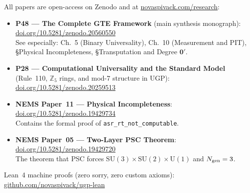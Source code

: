 \documentclass[11pt,a4paper]{article}
\newcommand{\lean}[1]{\texttt{#1}}
\begin{document}
\begin{tcolorbox}[colback=orange!8,colframe=orange!50!black,
  title=\textbf{Primary Sources}]
All papers are open-access on Zenodo and at
\href{https://novaspivack.com/research}{novaspivack.com/research}:
\begin{itemize}
\item \textbf{P48 --- The Complete GTE Framework} (main synthesis monograph):\\
  \href{https://doi.org/10.5281/zenodo.20560550}{doi.org/10.5281/zenodo.20560550}\\
  See especially: Ch.~5 (Binary Universality), Ch.~10 (Measurement and PIT),
  §Physical Incompleteness, §Transputation and Degree $\mathbf{0}'$.

\item \textbf{P28 --- Computational Universality and the Standard Model}\\
  (Rule~110, $\mathbb{Z}_5$ rings, and mod-7 structure in UGP):\\
  \href{https://doi.org/10.5281/zenodo.20259513}{doi.org/10.5281/zenodo.20259513}

\item \textbf{NEMS Paper~11 --- Physical Incompleteness}:\\
  \href{https://doi.org/10.5281/zenodo.19429734}{doi.org/10.5281/zenodo.19429734}\\
  Contains the formal proof of \lean{asr\_rt\_not\_computable}.

\item \textbf{NEMS Paper~05 --- Two-Layer PSC Theorem}:\\
  \href{https://doi.org/10.5281/zenodo.19429720}{doi.org/10.5281/zenodo.19429720}\\
  The theorem that PSC forces $\mathrm{SU}(3)\times\mathrm{SU}(2)\times\mathrm{U}(1)$
  and $N_{\rm gen}=3$.
\end{itemize}
Lean~4 machine proofs (zero sorry, zero custom axioms):\\
\href{https://github.com/novaspivack/ugp-lean}{github.com/novaspivack/ugp-lean}
\end{tcolorbox}
\end{document}
